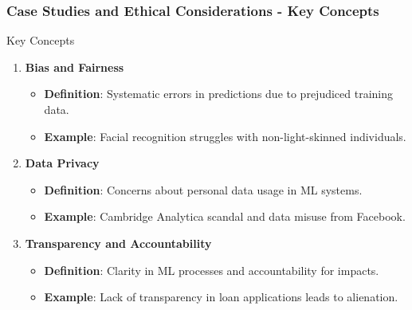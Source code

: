 \documentclass[aspectratio=169]{beamer}
\begin{document}
\begin{frame}[fragile]
    \frametitle{Case Studies and Ethical Considerations - Key Concepts}
    \begin{block}{Key Concepts}
        \begin{enumerate}
            \item \textbf{Bias and Fairness}
                \begin{itemize}
                    \item \textbf{Definition}: Systematic errors in predictions due to prejudiced training data.
                    \item \textbf{Example}: Facial recognition struggles with non-light-skinned individuals.
                \end{itemize}
            \item \textbf{Data Privacy}
                \begin{itemize}
                    \item \textbf{Definition}: Concerns about personal data usage in ML systems.
                    \item \textbf{Example}: Cambridge Analytica scandal and data misuse from Facebook.
                \end{itemize}
            \item \textbf{Transparency and Accountability}
                \begin{itemize}
                    \item \textbf{Definition}: Clarity in ML processes and accountability for impacts.
                    \item \textbf{Example}: Lack of transparency in loan applications leads to alienation.
                \end{itemize}
        \end{enumerate}
    \end{block}
\end{frame}
\end{document}
